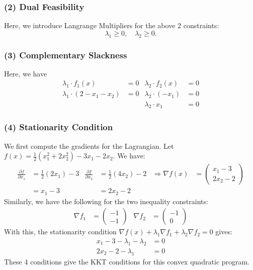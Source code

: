 \documentclass[12pt]{article}
\begin{document}
\subsubsection*{(2) Dual Feasibility}

Here, we introduce Langrange Multipliers for the above 2 constraints: \begin{equation*}
    \lambda_1 \geq 0, \quad \lambda_2 \geq 0.
\end{equation*}

\subsubsection*{(3) Complementary Slackness}

Here, we have \begin{align*}
    \lambda_1 \cdot f_{1}(x) &=0 &  \lambda_2 \cdot f_{2}(x) &= 0 \\ 
    \lambda_1 \cdot (2 - x_{1} - x_{2}) &= 0 & \lambda_2 \cdot (-x_{1}) &= 0 \\ 
    & & \lambda_2 \cdot x_{1} &= 0
\end{align*}

\subsubsection*{(4) Stationarity Condition}

We first compute the gradients for the Lagrangian. Let $f(x) = \frac{1}{2} (x_{1}^2 + 2x_{2}^2)- 3 x_{1} -2 x_{2}$. We have: \begin{align*}
    \frac{\partial f}{\partial x_{1}} &= \frac{1}{2}(2 x_{1}) - 3 & \frac{\partial f}{\partial x_{2}} &= \frac{1}{2} (4 x_{2}) - 2 & \Longrightarrow \nabla f(x) &= \begin{pmatrix}
        x_{1} - 3 \\ 
        2 x_{2} - 2
    \end{pmatrix}\\ 
    &= x_{1} - 3 & &= 2 x_{2} - 2
\end{align*} Similarly, we have the following for the two inequality constraints: \begin{align*}
    \nabla f_{1} &= \begin{pmatrix}
    -1 \\ -1
    \end{pmatrix} & \nabla f_{2} &= \begin{pmatrix}
        -1 \\ 0
    \end{pmatrix}
\end{align*} With this, the stationarity condition $\nabla f(x) + \lambda_1 \nabla f_{1} + \lambda_2 \nabla f_{2} = 0$ gives: \begin{align}
    x_{1} - 3 - \lambda_1 - \lambda_2 &= 0 \\
    2 x_{2} - 2 - \lambda_1 &= 0
\end{align} These 4 conditions give the KKT conditions for this convex quadratic program.
\end{document}
